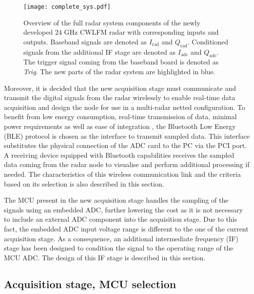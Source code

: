 \begin{figure}[ht]
	\centering
	\texttt{[image: complete\_sys.pdf]}
	\caption{Overview of the full radar system components of the newly developed 24 GHz CWLFM radar with corresponding inputs and outputs. Baseband signals are denoted as $I_{\mathrm{rad}}$ and $Q_{\mathrm{rad}}$. Conditioned signals from the additional IF stage are denoted as $I_{\mathrm{adc}}$ and $Q_{\mathrm{adc}}$. The trigger signal coming from the baseband board is denoted as \textit{Trig}. The new parts of the radar system are highlighted in blue. \label{fig:new_system}}
\end{figure}

Moreover, it is decided that the new acquisition stage must communicate and transmit the digital signals from the radar wirelessly to enable real-time data acquisition and design the node for use in a multi-radar netted configuration. To benefit from low energy consumption, real-time transmission of data, minimal power requirements as well as ease of integration \cite{Gomez2012}, the Bluetooth Low Energy (BLE) protocol is chosen as the interface to transmit sampled data. This interface substitutes the physical connection of the ADC card to the PC via the PCI port. A receiving device equipped with Bluetooth capabilities receives the sampled data coming from the radar node to visualise and perform additional processing if needed. The characteristics of this wireless communication link and the criteria based on its selection is also described in this section.

The MCU present in the new acquisition stage handles the sampling of the signals using an embedded ADC, further lowering the cost as it is not necessary to include an external ADC component into the acquisition stage. Due to this fact, the embedded ADC input voltage range is different to the one of the current acquisition stage. As a consequence, an additional intermediate frequency (IF) stage has been designed to condition the signal to the operating range of the MCU ADC. The design of this IF stage is described in this section.

\subsection{Acquisition stage, MCU selection} \label{sec:mcu_selection}

